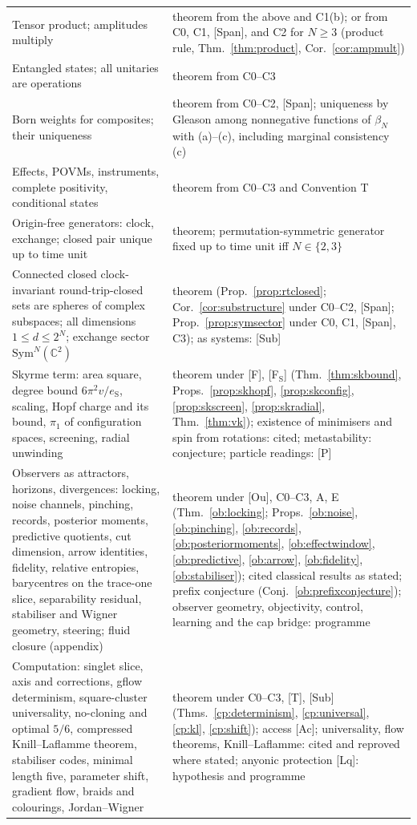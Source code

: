\documentclass[aps,pra,onecolumn,superscriptaddress,nofootinbib,10pt]{revtex4-2}
\theoremstyle{definition}
\theoremstyle{remark}
\newcommand{\C}{\mathbb{C}}
\begin{document}
\begin{table}[h]
\begin{tabular}{@{}p{}p{}@{}}
Tensor product; amplitudes multiply & theorem from the above and C1(b); or from C0, C1, [Span], and C2 for $N\ge3$ (product rule, Thm.~\ref{thm:product}, Cor.~\ref{cor:ampmult})\\
Entangled states; all unitaries are operations & theorem from C0--C3\\
Born weights for composites; their uniqueness & theorem from C0--C2, [Span]; uniqueness by Gleason among nonnegative functions of $\beta_N$ with (a)--(c), including marginal consistency (c)\\
Effects, POVMs, instruments, complete positivity, conditional states & theorem from C0--C3 and Convention T\\
Origin-free generators: clock, exchange; closed pair unique up to time unit & theorem; permutation-symmetric generator fixed up to time unit iff $N\in\{2,3\}$\\
Connected closed clock-invariant round-trip-closed sets are spheres of complex subspaces; all dimensions $1\le d\le2^N$; exchange sector $\mathrm{Sym}^N(\C^2)$ & theorem (Prop.~\ref{prop:rtclosed}; Cor.~\ref{cor:substructure} under C0--C2, [Span]; Prop.~\ref{prop:symsector} under C0, C1, [Span], C3); as systems: [Sub]\\
Skyrme term: area square, degree bound $6\pi^2v/e_{\mathrm S}$, scaling, Hopf charge and its bound, $\pi_1$ of configuration spaces, screening, radial unwinding & theorem under [F], [F$_{\mathrm S}$] (Thm.~\ref{thm:skbound}, Props.~\ref{prop:skhopf}, \ref{prop:skconfig}, \ref{prop:skscreen}, \ref{prop:skradial}, Thm.~\ref{thm:vk}); existence of minimisers and spin from rotations: cited; metastability: conjecture; particle readings: [P]\\
Observers as attractors, horizons, divergences: locking, noise channels, pinching, records, posterior moments, predictive quotients, cut dimension, arrow identities, fidelity, relative entropies, barycentres on the trace-one slice, separability residual, stabiliser and Wigner geometry, steering; fluid closure (appendix) & theorem under [Ou], C0--C3, A, E (Thm.~\ref{ob:locking}; Props.~\ref{ob:noise}, \ref{ob:pinching}, \ref{ob:records}, \ref{ob:posteriormoments}, \ref{ob:effectwindow}, \ref{ob:predictive}, \ref{ob:arrow}, \ref{ob:fidelity}, \ref{ob:stabiliser}); cited classical results as stated; prefix conjecture (Conj.~\ref{ob:prefixconjecture}); observer geometry, objectivity, control, learning and the cap bridge: programme\\
Computation: singlet slice, axis and corrections, gflow determinism, square-cluster universality, no-cloning and optimal $5/6$, compressed Knill--Laflamme theorem, stabiliser codes, minimal length five, parameter shift, gradient flow, braids and colourings, Jordan--Wigner & theorem under C0--C3, [T], [Sub] (Thms.~\ref{cp:determinism}, \ref{cp:universal}, \ref{cp:kl}, \ref{cp:shift}); access [Ac]; universality, flow theorems, Knill--Laflamme: cited and reproved where stated; anyonic protection [Lq]: hypothesis and programme\\

\end{tabular}
\end{table}
\end{document}
